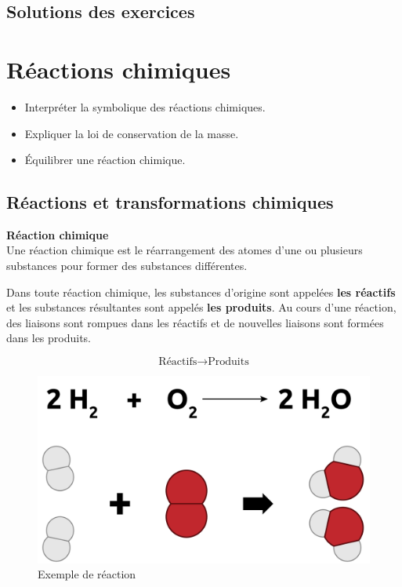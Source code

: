 \documentclass[
  11pt,
  french,
  a4paper,
  openany]{book}
\providecommand{\tightlist}{%
  \setlength{\itemsep}{0pt}\setlength{\parskip}{0pt}}
\begin{document}
\newpage

\section{Solutions des exercices} \shipoutAnswer

\hypertarget{ruxe9actions-chimiques}{%
\chapter{Réactions chimiques}\label{ruxe9actions-chimiques}}

\begin{objectives}

\begin{itemize}
\tightlist
\item
  Interpréter la symbolique des réactions chimiques.
\item
  Expliquer la loi de conservation de la masse.
\item
  Équilibrer une réaction chimique.
\end{itemize}


\end{objectives}

\hypertarget{ruxe9actions-et-transformations-chimiques}{%
\section{Réactions et transformations chimiques}\label{ruxe9actions-et-transformations-chimiques}}

\begin{tcolorbox}
\textbf{Réaction chimique}\\
Une réaction chimique est le réarrangement des atomes d'une ou plusieurs substances pour former des substances différentes.

\end{tcolorbox}

Dans toute réaction chimique, les substances d'origine sont appelées \textbf{les réactifs} et les substances résultantes sont appelés \textbf{les produits}. Au cours d'une réaction, des liaisons sont rompues dans les réactifs et de nouvelles liaisons sont formées dans les produits.

\[ \text{Réactifs} \longrightarrow \text{Produits} \]

\begin{figure}

{\centering \includegraphics[width=0.45\linewidth]{images/reactions-1} 

}

\caption{Exemple de réaction}\label{fig:reactions-1}
\end{figure}
\end{document}
